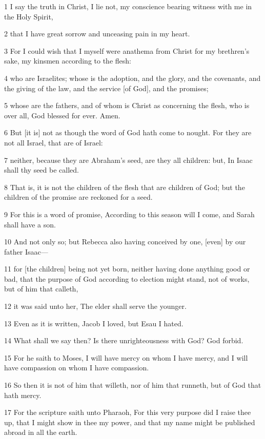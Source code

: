 \par 1 I say the truth in Christ, I lie not, my conscience bearing witness with me in the Holy Spirit,
\par 2 that I have great sorrow and unceasing pain in my heart.
\par 3 For I could wish that I myself were anathema from Christ for my brethren's sake, my kinsmen according to the flesh:
\par 4 who are Israelites; whose is the adoption, and the glory, and the covenants, and the giving of the law, and the service [of God], and the promises;
\par 5 whose are the fathers, and of whom is Christ as concerning the flesh, who is over all, God blessed for ever. Amen.
\par 6 But [it is] not as though the word of God hath come to nought. For they are not all Israel, that are of Israel:
\par 7 neither, because they are Abraham's seed, are they all children: but, In Isaac shall thy seed be called.
\par 8 That is, it is not the children of the flesh that are children of God; but the children of the promise are reckoned for a seed.
\par 9 For this is a word of promise, According to this season will I come, and Sarah shall have a son.
\par 10 And not only so; but Rebecca also having conceived by one, [even] by our father Isaac—
\par 11 for [the children] being not yet born, neither having done anything good or bad, that the purpose of God according to election might stand, not of works, but of him that calleth,
\par 12 it was said unto her, The elder shall serve the younger.
\par 13 Even as it is written, Jacob I loved, but Esau I hated.
\par 14 What shall we say then? Is there unrighteousness with God? God forbid.
\par 15 For he saith to Moses, I will have mercy on whom I have mercy, and I will have compassion on whom I have compassion.
\par 16 So then it is not of him that willeth, nor of him that runneth, but of God that hath mercy.
\par 17 For the scripture saith unto Pharaoh, For this very purpose did I raise thee up, that I might show in thee my power, and that my name might be published abroad in all the earth.
